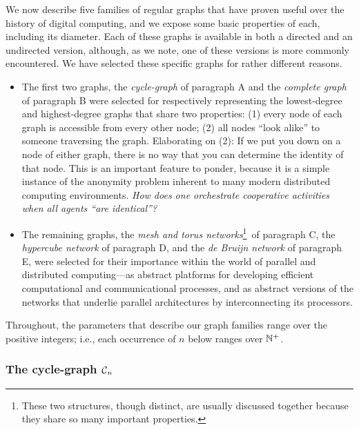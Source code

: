 We now describe five families of regular graphs that have proven
useful over the history of digital computing, and we expose some basic
properties of each, including its diameter.  Each of these graphs is
available in both a directed and an undirected version, although, as
we note, one of these versions is more commonly encountered.  We have
selected these specific graphs for rather different reasons.
\begin{itemize}
\item
The first two graphs, the {\it cycle-graph} of paragraph {\small\sf A}
and the {\it complete graph} of paragraph {\small\sf B} were selected
for respectively representing the lowest-degree and highest-degree
graphs that share two properties: (1) every node of each graph is
accessible from every other node; (2) all nodes ``look alike'' to
someone traversing the graph.  Elaborating on (2): If we put you down
on a node of either graph, there is no way that you can determine the
identity of that node.  This is an important feature to ponder,
because it is a simple instance of the anonymity problem inherent to
many modern distributed computing environments.  {\it How does one
  orchestrate cooperative activities when all agents ``are
  identical''?}

\item
The remaining graphs, the {\it mesh and torus networks}\footnote{These
  two structures, though distinct, are usually discussed together
  because they share so many important properties.}~of paragraph
{\small\sf C}, the {\it hypercube network} of paragraph {\small\sf D},
and the {\it de Bruijn network} of paragraph {\small\sf E}, were
selected for their importance within the world of parallel and
distributed computing---as abstract platforms for developing efficient
computational and communicational processes, and as abstract versions
of the networks that underlie parallel architectures by
interconnecting its processors.
\end{itemize}
Throughout, the parameters that describe our graph families range over
the positive integers; i.e., each occurrence of $n$ below ranges over
$\mathbb{N}^+$.

\subsubsection{The cycle-graph $\mbox{$\cal C$}_n$}

